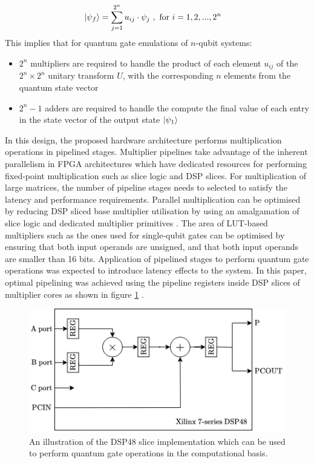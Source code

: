 \begin{align}\label{eqn:multipliers+adders}
	\ket{\psi_f}	& = \sum_{j = 1}^{2^n} u_{ij} \cdot \psi_{j}~,~\text{for}~i=1,2,...,2^n
\end{align}
This implies that for quantum gate emulations of $n$-qubit systems:
\begin{itemize}
	\item 
	$2^n$ multipliers are required to handle the product of each element $u_{ij}$ of the $2^n \times 2^n$ unitary transform $U$, with the corresponding $n$ elements from the quantum state vector
	\item
	$2^n - 1$ adders are required to handle the compute the final value of each entry in the state vector of the output state $\ket{\psi_1}$
\end{itemize}
In this design, the proposed hardware architecture performs multiplication operations in pipelined stages. Multiplier pipelines take advantage of the inherent parallelism in FPGA architectures which have dedicated resources for performing fixed-point multiplication such as slice logic and DSP slices. For multiplication of large matrices, the number of pipeline stages needs to selected to satisfy the latency and performance requirements. Parallel multiplication can be optimised by reducing DSP sliced base multiplier utilisation by using an amalgamation of slice logic and dedicated multiplier primitives \cite{xilinx20167series}. The area of LUT-based multipliers such as the ones used for single-qubit gates can be optimised by ensuring that both input operands are unsigned, and that both input operands are smaller than 16 bits. Application of pipelined stages to perform quantum gate operations was expected to introduce latency effects to the system. In this paper, optimal pipelining was achieved using the pipeline registers inside DSP slices of multiplier cores as shown in figure \ref{fig:dsp-opt-pipeline} \cite{xilinx2014multiadder}.
\begin{figure}[!ht]
	\centering
	\includegraphics[width=0.80\linewidth]{body/ch4/figs/dsp-opt-pipeline}
	\caption[Illustrating Xilinx 7-Series FPGA DSP48 for Performing Matrix Products Associated with Quantum Gate Operations.]{An illustration of the DSP48 slice implementation which can be used to perform quantum gate operations in the computational basis.}
	\label{fig:dsp-opt-pipeline}
\end{figure}

